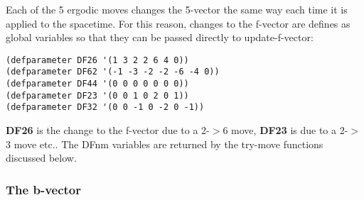 \message{ !name(programmers_guide.tex)}\documentclass[12pt]{article}
\begin{document}
Each of the 5 ergodic moves changes the 5-vector the same way each
time it is applied to the spacetime. For this reason, changes to the
f-vector are defines as global variables so that they can be passed
directly to update-f-vector:
\begin{lstlisting}
(defparameter DF26 '(1 3 2 2 6 4 0))
(defparameter DF62 '(-1 -3 -2 -2 -6 -4 0))
(defparameter DF44 '(0 0 0 0 0 0 0))
(defparameter DF23 '(0 0 1 0 2 0 1))
(defparameter DF32 '(0 0 -1 0 -2 0 -1))
\end{lstlisting}
\textbf{DF26} is the change to the f-vector due to a 2-$>$6 move,
\textbf{DF23} is due to a 2-$>$3 move etc.. The DFnm variables are
returned by the try-move functions discussed below.

\subsubsection{The b-vector}
\end{document}
